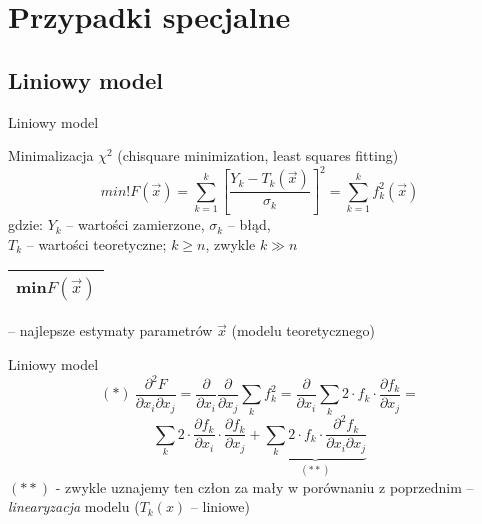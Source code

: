 \section{Przypadki specjalne}

\subsection{Liniowy model}
  \begin{frame}{Liniowy model}
    \begin{block}{Minimalizacja $\chi^{2}$ (chisquare minimization, least squares fitting)}
      \begin{displaymath}
        min!F(\vec{x}) = \sum_{k=1}^{k} \left[ \frac{Y_{k} - T_{k}(\vec{x})}{\sigma_{k}} \right]^{2} = \sum_{k=1}^{k} f_{k}^{2}(\vec{x})
      \end{displaymath}
      gdzie: $Y_{k}$ -- wartości zamierzone, $\sigma_{k}$ -- błąd,\\
      $T_{k}$ -- wartości teoretyczne; $k \geq n$, zwykle $k \gg n$ \\
      \begin{tabular}{|c|} \hline
        min$F(\vec{x})$ \\ \hline
      \end{tabular}
      -- najlepsze estymaty parametrów $\vec{x}$
      (modelu teoretycznego)
    \end{block}

  \end{frame}

  \begin{frame}{Liniowy model}
    \begin{equation}
      (*)\ \frac{\partial^2 F}{\partial x_{i} \partial x_{j}} =
      \frac{\partial}{\partial x_{i}} \frac{\partial}{\partial x_{j}}
      \sum_{k} f_{k}^2 = \frac{\partial}{\partial x_{i}}
      \sum_{k} 2 \cdot f_{k} \cdot \frac{\partial f_{k}}{\partial x_{j}} =
      \nonumber
    \end{equation}
    \begin{equation}
      \sum_{k} 2 \cdot \frac{\partial f_{k}}{\partial x_{i}} \cdot
      \frac{\partial f_{k}}{\partial x_{j}} +
      \underbrace{
        \sum_{k} 2 \cdot f_{k} \cdot
        \frac{\partial^2 f_{k}}{\partial x_{i} \partial x_{j}}
      }_{(**)}
      \nonumber
    \end{equation}
    $(**)$ - zwykle uznajemy ten człon za mały w porównaniu
    z poprzednim -- \emph{linearyzacja} modelu ($T_{k}(x)$ -- liniowe)
  \end{frame}

